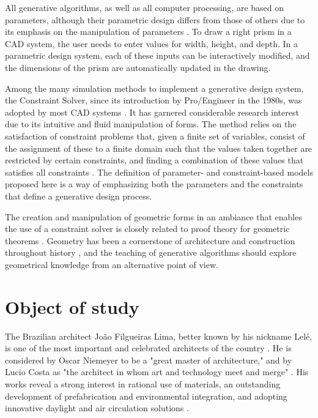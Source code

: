 \documentclass[preprint,12pt,3p]{elsarticle}
\begin{document}
All generative algorithms, as well as all computer processing, are based on parameters, although their parametric design differs from those of others due to its emphasis on the manipulation of parameters \cite{DIno2012}. To draw a right prism in a CAD system, the user needs to enter values for width, height, and depth. In a parametric design system, each of these inputs can be interactively modified, and the dimensions of the prism are automatically updated in the drawing.

Among the many simulation methods to implement a generative design system, the Constraint Solver, since its introduction by Pro/Engineer in the 1980s, was adopted by most CAD systems \cite{Hoffmann2005}. It has garnered considerable research interest due to its intuitive and fluid manipulation of forms. The method relies on the satisfaction of constraint problems that, given a finite set of variables, consist of the assignment of these to a finite domain such that the values taken together are restricted by certain constraints, and finding a combination of these values that satisfies all constraints \cite{Bartk01theoryand}. The definition of parameter- and constraint-based models proposed here is a way of emphasizing both the parameters and the constraints that define a generative design process. 

The creation and manipulation of geometric forms in an ambiance that enables the use of a constraint solver is closely related to proof theory for geometric theorems \cite{Hoffmann2005}. Geometry has been a cornerstone of architecture and construction throughout history \cite{ceccato2010mbg}, and the teaching of generative algorithms should explore geometrical knowledge from an alternative point of view.  

\section{Object of study}
\label{obstudy}

The Brazilian architect Jo\~ao Filgueiras Lima, better known by his nickname Lel\'e, is one of the most important and celebrated architects of the country \cite{ARQ:359533}. He is considered by Oscar Niemeyer to be a "great master of architecture," and by Lucio Costa as "the architect in whom art and technology meet and merge" \cite{ferraz2000joão}. His works reveal a strong interest in rational use of materials, an outstanding development of prefabrication and environmental integration, and adopting innovative daylight and air circulation solutions \cite{Campagnol2014} \cite{Maciel2007}.
\end{document}
